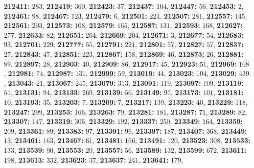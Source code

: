 \textsf{\bfseries 212411:} $283$, \textsf{\bfseries 212419:} $360$, \textsf{\bfseries 212423:} $37$, \textsf{\bfseries 212437:} $104$, \textsf{\bfseries 212447:} $56$, \textsf{\bfseries 212453:} $2$, \textsf{\bfseries 212461:} $98$, \textsf{\bfseries 212467:} $123$, \textsf{\bfseries 212479:} $6$, \textsf{\bfseries 212501:} $224$, \textsf{\bfseries 212507:} $281$, \textsf{\bfseries 212557:} $145$, \textsf{\bfseries 212561:} $203$, \textsf{\bfseries 212573:} $108$, \textsf{\bfseries 212579:} $165$, \textsf{\bfseries 212587:} $131$, \textsf{\bfseries 212593:} $168$, \textsf{\bfseries 212627:} $277$, \textsf{\bfseries 212633:} $82$, \textsf{\bfseries 212651:} $264$, \textsf{\bfseries 212669:} $204$, \textsf{\bfseries 212671:} $3$, \textsf{\bfseries 212677:} $54$, \textsf{\bfseries 212683:} $93$, \textsf{\bfseries 212701:} $229$, \textsf{\bfseries 212777:} $55$, \textsf{\bfseries 212791:} $221$, \textsf{\bfseries 212801:} $57$, \textsf{\bfseries 212827:} $57$, \textsf{\bfseries 212837:} $27$, \textsf{\bfseries 212843:} $47$, \textsf{\bfseries 212851:} $223$, \textsf{\bfseries 212867:} $158$, \textsf{\bfseries 212869:} $46$, \textsf{\bfseries 212873:} $26$, \textsf{\bfseries 212881:} $89$, \textsf{\bfseries 212897:} $28$, \textsf{\bfseries 212903:} $40$, \textsf{\bfseries 212909:} $86$, \textsf{\bfseries 212917:} $45$, \textsf{\bfseries 212923:} $51$, \textsf{\bfseries 212969:} $108$, \textsf{\bfseries 212981:} $74$, \textsf{\bfseries 212987:} $131$, \textsf{\bfseries 212999:} $59$, \textsf{\bfseries 213019:} $44$, \textsf{\bfseries 213023:} $104$, \textsf{\bfseries 213029:} $439$, \textsf{\bfseries 213043:} $21$, \textsf{\bfseries 213067:} $245$, \textsf{\bfseries 213079:} $313$, \textsf{\bfseries 213091:} $119$, \textsf{\bfseries 213097:} $109$, \textsf{\bfseries 213119:} $51$, \textsf{\bfseries 213131:} $94$, \textsf{\bfseries 213133:} $269$, \textsf{\bfseries 213139:} $56$, \textsf{\bfseries 213149:} $97$, \textsf{\bfseries 213173:} $101$, \textsf{\bfseries 213181:} $10$, \textsf{\bfseries 213193:} $35$, \textsf{\bfseries 213203:} $7$, \textsf{\bfseries 213209:} $7$, \textsf{\bfseries 213217:} $139$, \textsf{\bfseries 213223:} $40$, \textsf{\bfseries 213229:} $118$, \textsf{\bfseries 213247:} $299$, \textsf{\bfseries 213253:} $166$, \textsf{\bfseries 213263:} $79$, \textsf{\bfseries 213281:} $181$, \textsf{\bfseries 213287:} $71$, \textsf{\bfseries 213289:} $82$, \textsf{\bfseries 213307:} $147$, \textsf{\bfseries 213319:} $306$, \textsf{\bfseries 213329:} $192$, \textsf{\bfseries 213337:} $250$, \textsf{\bfseries 213349:} $164$, \textsf{\bfseries 213359:} $209$, \textsf{\bfseries 213361:} $89$, \textsf{\bfseries 213383:} $97$, \textsf{\bfseries 213391:} $96$, \textsf{\bfseries 213397:} $187$, \textsf{\bfseries 213407:} $368$, \textsf{\bfseries 213449:} $13$, \textsf{\bfseries 213461:} $163$, \textsf{\bfseries 213467:} $61$, \textsf{\bfseries 213481:} $166$, \textsf{\bfseries 213491:} $120$, \textsf{\bfseries 213523:} $308$, \textsf{\bfseries 213533:} $133$, \textsf{\bfseries 213539:} $90$, \textsf{\bfseries 213553:} $20$, \textsf{\bfseries 213557:} $56$, \textsf{\bfseries 213589:} $132$, \textsf{\bfseries 213599:} $672$, \textsf{\bfseries 213611:} $198$, \textsf{\bfseries 213613:} $332$, \textsf{\bfseries 213623:} $37$, \textsf{\bfseries 213637:} $241$, \textsf{\bfseries 213641:} $179$, 
